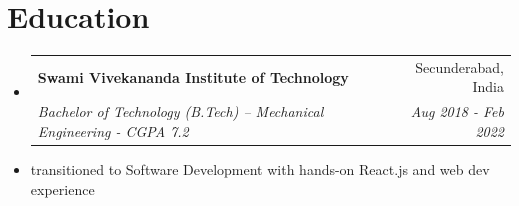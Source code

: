 \documentclass[letterpaper,11pt]{article}
\makeatletter
\newcommand{\resumeItem}[1]{
  \item\small{
    {#1 \vspace{-2pt}}
  }
}
\newcommand{\resumeSubheading}[4]{
  \vspace{-2pt}\item
    \begin{tabular*}{0.97\textwidth}[t]{l@{\extracolsep{\fill}}r}
      \textbf{#1} & #2 \\
      \textit{\small#3} & \textit{\small #4} \\
    \end{tabular*}\vspace{-7pt}
}
\newcommand{\resumeSubHeadingListStart}{\begin{itemize}[leftmargin=0.15in, label={}]}
\newcommand{\resumeSubHeadingListEnd}{\end{itemize}}
\newcommand{\resumeItemListStart}{\begin{itemize}}
\newcommand{\resumeItemListEnd}{\end{itemize}\vspace{-5pt}}
\makeatother
\begin{document}

%

        
%

\section{Education}
  \resumeSubHeadingListStart
    \resumeSubheading
      {Swami Vivekananda Institute of Technology}{Secunderabad, India}
      {Bachelor of Technology (B.Tech) – Mechanical Engineering - CGPA 7.2}{Aug 2018 - Feb 2022}
      \resumeItem{transitioned to Software Development with hands-on React.js and web dev experience}
  \resumeSubHeadingListEnd




\end{document}
